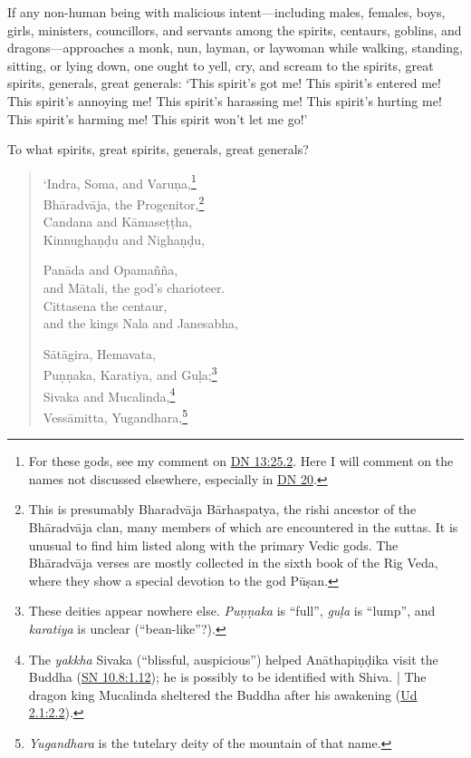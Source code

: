 \documentclass[12pt,openany]{book}%
\begin{document}
If any non-human being with malicious intent—including males, females, boys, girls, ministers, councillors, and servants among the spirits, centaurs, goblins, and dragons—approaches a monk, nun, layman, or laywoman while walking, standing, sitting, or lying down, one ought to yell, cry, and scream to the spirits, great spirits, generals, great generals: ‘This spirit’s got me! This spirit’s entered me! This spirit’s annoying me! This spirit’s harassing me! This spirit’s hurting me! This spirit’s harming me! This spirit won’t let me go!’ 

To what spirits, great spirits, generals, great generals? 

\begin{verse}%
‘Indra, Soma, and \textsanskrit{Varuṇa},\footnote{For these gods, see my comment on \href{https://suttacentral.net/dn13/en/sujato\#25.2}{DN 13:25.2}. Here I will comment on the names not discussed elsewhere, especially in \href{https://suttacentral.net/dn20/en/sujato}{DN 20}. } \\
\textsanskrit{Bhāradvāja}, the Progenitor,\footnote{This is presumably \textsanskrit{Bharadvāja} \textsanskrit{Bārhaspatya}, the rishi ancestor of the \textsanskrit{Bhāradvāja} clan, many members of which are encountered in the suttas. It is unusual to find him listed along with the primary Vedic gods. The \textsanskrit{Bhāradvāja} verses are mostly collected in the sixth book of the Rig Veda, where they show a special devotion to the god \textsanskrit{Pūṣan}. } \\
Candana and \textsanskrit{Kāmaseṭṭha}, \\
\textsanskrit{Kinnughaṇḍu} and \textsanskrit{Nighaṇḍu}, 

\textsanskrit{Panāda} and \textsanskrit{Opamañña}, \\
and \textsanskrit{Mātali}, the god’s charioteer. \\
Cittasena the centaur, \\
and the kings Nala and Janesabha, 

\textsanskrit{Sātāgira}, Hemavata, \\
\textsanskrit{Puṇṇaka}, Karatiya, and \textsanskrit{Guḷa};\footnote{These deities appear nowhere else. \textit{\textsanskrit{Puṇṇaka}} is “full”, \textit{\textsanskrit{guḷa}} is “lump”, and \textit{karatiya} is unclear (“bean-like”?). } \\
Sivaka and Mucalinda,\footnote{The \textit{yakkha} Sivaka (“blissful, auspicious”) helped \textsanskrit{Anāthapiṇḍika} visit the Buddha (\href{https://suttacentral.net/sn10.8/en/sujato\#1.12}{SN 10.8:1.12}); he is possibly to be identified with Shiva. | The dragon king Mucalinda sheltered the Buddha after his awakening (\href{https://suttacentral.net/ud2.1/en/sujato\#2.2}{Ud 2.1:2.2}). } \\
\textsanskrit{Vessāmitta}, Yugandhara,\footnote{\textit{Yugandhara} is the tutelary deity of the mountain of that name. } 


\end{verse}
\end{document}
